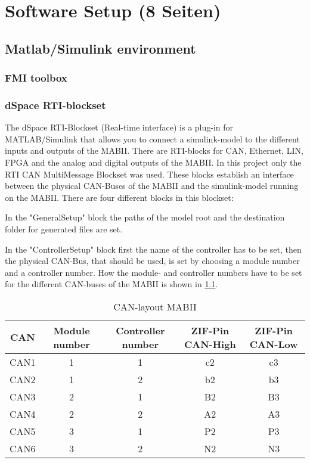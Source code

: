 \documentclass[ExampleMasters.tex]{subfiles}
\begin{document}
\clearpage


\chapter{Software Setup (8 Seiten)}
\label{chap:software_setup}
\section{Matlab/Simulink environment}
\label{sec:matlab}

\subsection{FMI toolbox}
\subsection{dSpace RTI-blockset}
The dSpace RTI-Blockset (Real-time interface) is a plug-in for MATLAB/Simulink that allows you to connect a simulink-model to the different inputs and outputs of the MABII. There are RTI-blocks for CAN, Ethernet, LIN, FPGA and the analog and digital outputs of the MABII.
In this project only the RTI CAN MultiMessage Blockset was used. These blocks establish an interface between the physical CAN-Buses of the MABII and the simulink-model running on the MABII. There are four different blocks in this blockset: 

In the "GeneralSetup" block the paths of the model root and the destination folder for generated files are set. 

In the "ControllerSetup" block first the name of the controller has to be set, then the physical CAN-Bus, that should be used, is set by choosing a module number and a controller number. How the module- and controller numbers have to be set for the different CAN-buses of the MABII is shown in \ref{tab:CAN-layout}.
\begin{table}[h]
	\centering
	\caption{CAN-layout MABII}
	\label{tab:CAN-layout}
	\begin{tabular}{c|c|c|c|c|}
		CAN   & Module number & Controller number & ZIF-Pin CAN-High & ZIF-Pin CAN-Low  \\ \hline
		CAN1     &       1 & 1  & c2 & c3         \\
		CAN2   &      1 & 2  & b2 & b3    \\
		CAN3 &      2 & 1 & B2 & B3        \\
		CAN4& 2 & 2 & A2 & A3  \\
		CAN5& 3 & 1 & P2 & P3 \\
		CAN6& 3 & 2 & N2 & N3 \\
	\end{tabular} \\
\end{table}
\end{document}
